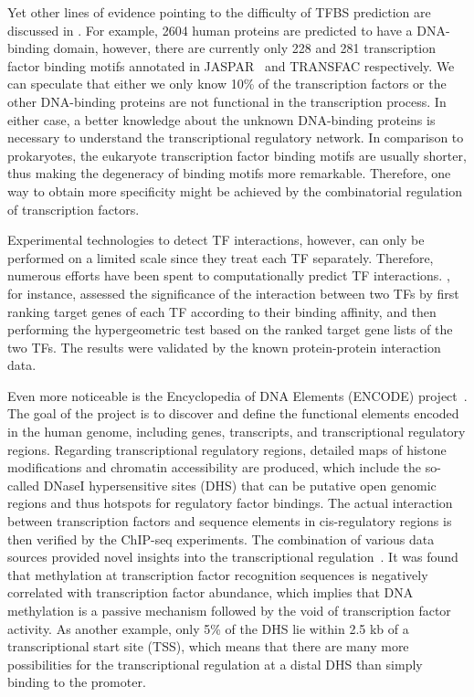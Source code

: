 Yet other lines of evidence pointing to the difficulty of TFBS prediction are
discussed in \cite{Babu2004}. For example, 2604 human proteins are predicted to
have a DNA-binding domain, however, there are currently only 228 and 281 
transcription
factor binding motifs annotated in JASPAR~\citep{Sandelin2004} and TRANSFAC 
respectively. We can speculate that either we only know 10\% of the transcription
factors or the other DNA-binding proteins are not functional in the transcription
process. In either case, a better knowledge about the unknown DNA-binding
proteins is necessary to understand the transcriptional regulatory network.
In comparison to prokaryotes, the eukaryote transcription factor binding motifs 
are usually shorter, thus making the degeneracy of binding motifs more remarkable.
Therefore, one way to obtain more specificity might be achieved by the 
combinatorial regulation of transcription factors.

Experimental technologies to detect TF interactions, however,
can only be performed on a limited scale since they treat 
each TF separately. Therefore, numerous efforts have been
spent to computationally predict TF interactions. 
\cite{Mysickova2012}, for instance, assessed the significance
of the interaction between two TFs by first ranking target
genes of each TF according to their binding affinity, 
and then 
performing the hypergeometric 
test based on the ranked target gene lists of the two TFs.
The results were validated by the known protein-protein
interaction data.

Even more noticeable is the Encyclopedia of DNA Elements 
(ENCODE) project~\citep{ENCODE2011}. The goal of the project
is to discover and define the functional elements encoded 
in the human genome, including genes, transcripts, and 
transcriptional regulatory regions. Regarding transcriptional
regulatory regions, detailed maps of histone modifications
and chromatin accessibility are produced, which include
the so-called DNaseI hypersensitive sites (DHS) 
that can be putative
open genomic regions and thus hotspots for regulatory factor
bindings. The actual interaction between transcription
factors and sequence elements in cis-regulatory regions
is then verified by the ChIP-seq experiments. The combination
of various data sources provided novel insights into the
transcriptional regulation~\citep{Thurman2012b}. 
It was found that methylation at transcription factor
recognition sequences is negatively correlated with 
transcription factor abundance, which implies that DNA
methylation is a passive mechanism followed by the void of
transcription factor activity.
As another example, only 5\% of the DHS lie within 2.5 kb of a
transcriptional start site (TSS), which means that there are 
many more possibilities for the transcriptional regulation 
at a distal DHS than simply binding to the promoter.

